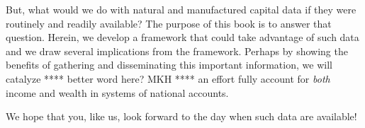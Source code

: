 But, what would we do with natural and manufactured capital data if they were 
routinely and readily available? 
The purpose of this book is to answer that question.
Herein, we develop a framework that could take advantage of such data
and we draw several implications from the framework. 
Perhaps by showing the benefits of gathering and disseminating
this important information, 
we will catalyze **** better word here? MKH **** an effort 
fully account for \emph{both} income and wealth in systems of national accounts.

We hope that you, like us, look forward to the day when such data are available!







%
%


